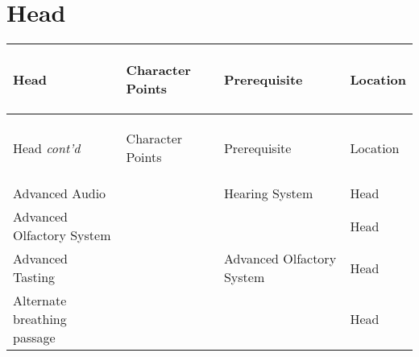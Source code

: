 \documentclass[twoside]{book}
\begin{document}
    

\section{Head}
    
\begin{longtable}{p{1.25in}p{2em}ll} 
  Head
  &
  \begin{turn}{70}{Character Points}\end{turn}
          
  &
  \begin{turn}{70}{Prerequisite}\end{turn}
          
  &
  \begin{turn}{70}{Location}\end{turn}
          
  \\
  \hline
  \hline
  \endfirsthead
  Head \textit{cont'd}
        
  &
  \begin{turn}{70}{Character Points}\end{turn}
          
  &
  \begin{turn}{70}{Prerequisite}\end{turn}
          
  &
  \begin{turn}{70}{Location}\end{turn}
          
  \\
  \hline
  \endhead
      
  \raggedright
           Advanced Audio 
  &
  
  &
   Hearing System 
  &
   Head 
  \tabularnewline
      
  \raggedright
           Advanced Olfactory System
           
  &
  
  &
  
  &
   Head 
  \tabularnewline
      
  \raggedright
           Advanced Tasting 
  &
  
  &
   Advanced Olfactory
           System 
  &
   Head 
  \tabularnewline
      
  \raggedright
           Alternate breathing passage
           
  &
  
  &
  
  &
   Head 
  \tabularnewline
      

\end{longtable}
\end{document}
